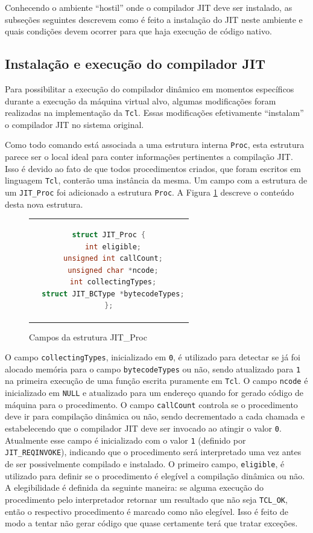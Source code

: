 Conhecendo o ambiente ``hostil'' onde o compilador JIT deve ser
instalado, as subseções seguintes descrevem como é feito a instalação do
JIT neste ambiente e quais condições devem ocorrer para que haja
execução de código nativo.

\subsection{Instalação e execução do compilador JIT}
\label{install-exec2}
Para possibilitar a execução do compilador dinâmico em momentos
específicos durante a execução da máquina virtual alvo, algumas
modificações foram realizadas na implementação da
\texttt{Tcl}. Essas modificações efetivamente ``instalam'' o
compilador JIT no sistema original.

Como todo comando está associada a uma estrutura interna \verb!Proc!,
esta estrutura parece ser o local ideal para conter informações
pertinentes a compilação JIT. Isso é devido ao fato de que todos procedimentos
criados, que foram escritos em linguagem \texttt{Tcl}, conterão uma
instância da mesma. Um campo com a estrutura de um
\verb!JIT_Proc! foi adicionado a estrutura \verb!Proc!. A Figura
\ref{jitproc} descreve o conteúdo desta nova estrutura.

\begin{figure}[h]
  \centering
  \begin{tabular}{c}
    \begin{lstlisting}[language=C]
struct JIT_Proc {
  int eligible;
  unsigned int callCount;
  unsigned char *ncode;
  int collectingTypes;
  struct JIT_BCType *bytecodeTypes;
};
    \end{lstlisting}
  \end{tabular}
  \caption{Campos da estrutura JIT\_Proc\label{jitproc}}
\end{figure}

O campo \verb!collectingTypes!, inicializado em \verb!0!, é utilizado para
detectar se já foi alocado memória para o campo \verb!bytecodeTypes!
ou não, sendo atualizado para \verb!1! na primeira execução de uma
função escrita puramente em \texttt{Tcl}. O campo \verb!ncode! é
inicializado em \verb!NULL! e atualizado para um endereço quando for
gerado código de máquina para o procedimento. O campo \verb!callCount!
controla se o procedimento deve ir para compilação dinâmica ou não,
sendo decrementado a cada chamada e estabelecendo que o compilador JIT
deve ser invocado ao atingir
o valor \verb!0!. Atualmente esse campo é inicializado com o valor
\verb!1! (definido por \verb!JIT_REQINVOKE!),
indicando que o procedimento será interpretado uma vez antes
de ser possivelmente compilado e instalado. O primeiro
campo, \verb!eligible!, é utilizado para definir se o
procedimento é elegível a compilação dinâmica ou não. A elegibilidade
é definida da seguinte maneira: se alguma execução do procedimento pelo
interpretador retornar um resultado que não seja \verb!TCL_OK!, então
o respectivo procedimento é marcado como não elegível. Isso é feito de
modo a tentar não gerar código que quase certamente terá que
tratar exceções.


